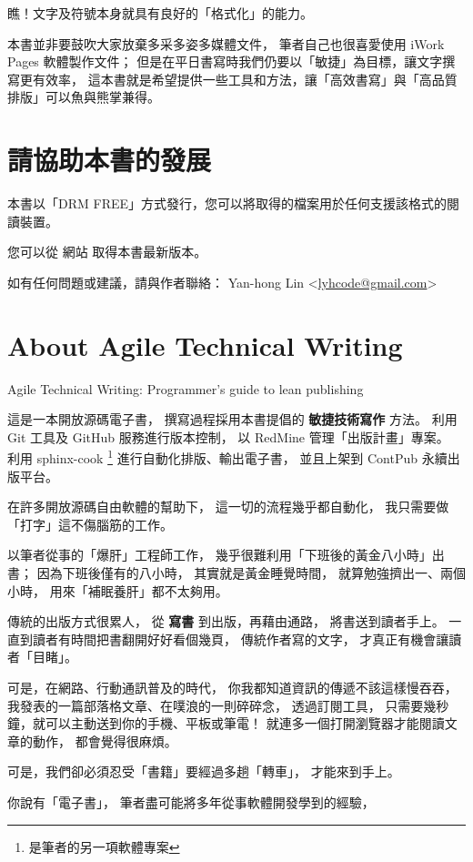 \documentclass[a4paper,12pt,english]{sphinxmanual}
\begin{document}
瞧！文字及符號本身就具有良好的「格式化」的能力。

本書並非要鼓吹大家放棄多采多姿多媒體文件，
筆者自己也很喜愛使用 iWork Pages 軟體製作文件；
但是在平日書寫時我們仍要以「敏捷」為目標，讓文字撰寫更有效率，
這本書就是希望提供一些工具和方法，讓「高效書寫」與「高品質排版」可以魚與熊掌兼得。


\chapter{請協助本書的發展}
\label{copyright::doc}\label{copyright:id1}
本書以「DRM FREE」方式發行，您可以將取得的檔案用於任何支援該格式的閱讀裝置。

您可以從 網站 取得本書最新版本。

如有任何問題或建議，請與作者聯絡： Yan-hong Lin \textless{}\href{mailto:lyhcode@gmail.com}{lyhcode@gmail.com}\textgreater{}


\chapter{About Agile Technical Writing}
\label{README:about-agile-technical-writing}\label{README::doc}
Agile Technical Writing: Programmer's guide to lean publishing

這是一本開放源碼電子書，
撰寫過程採用本書提倡的 \textbf{敏捷技術寫作} 方法。
利用 Git 工具及 GitHub 服務進行版本控制，
以 RedMine 管理「出版計畫」專案。
利用 sphinx-cook \footnote{
是筆者的另一項軟體專案
} 進行自動化排版、輸出電子書，
並且上架到 ContPub 永續出版平台。

在許多開放源碼自由軟體的幫助下，
這一切的流程幾乎都自動化，
我只需要做「打字」這不傷腦筋的工作。

以筆者從事的「爆肝」工程師工作，
幾乎很難利用「下班後的黃金八小時」出書；
因為下班後僅有的八小時，
其實就是黃金睡覺時間，
就算勉強擠出一、兩個小時，
用來「補眠養肝」都不太夠用。

傳統的出版方式很累人，
從 \textbf{寫書} 到出版，再藉由通路，
將書送到讀者手上。
一直到讀者有時間把書翻開好好看個幾頁，
傳統作者寫的文字，
才真正有機會讓讀者「目睹」。

可是，在網路、行動通訊普及的時代，
你我都知道資訊的傳遞不該這樣慢吞吞，
我發表的一篇部落格文章、在噗浪的一則碎碎念，
透過訂閱工具，
只需要幾秒鐘，就可以主動送到你的手機、平板或筆電！
就連多一個打開瀏覽器才能閱讀文章的動作，
都會覺得很麻煩。

可是，我們卻必須忍受「書籍」要經過多趟「轉車」，
才能來到手上。

你說有「電子書」，
筆者盡可能將多年從事軟體開發學到的經驗，
\end{document}
